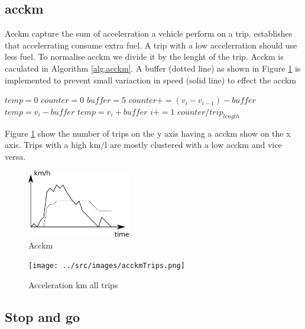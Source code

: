 \subsection{acckm}

Acckm capture the sum of accelerration a vehicle perform on a trip. \cite{} establishes that accelerrating consume extra fuel. A trip with a low accelerration should use less fuel. To normalise acckm we divide it by the lenght of the trip. Acckm is caculated in Algorithm \ref{alg.acckm}. A buffer (dotted line) as shown in Figure \ref{fig:acckm} is implemented to prevent small variaction in speed (solid line) to effect the acckm

\begin{algorithm}
\caption{$acckm$}\label{alg.acckm}
\begin{algorithmic}[1]
\State $temp = 0$
\State $counter = 0$
\State $buffer = 5$
	\State $counter += (v_i - v_{i-1}) - buffer$
	\State $temp = v_i - buffer$
	\State $temp = v_i + buffer$
\EndIf
\State $i+=1$
\EndWhile
\State \Return $ counter / trip_{length}$

\end{algorithmic}
\end{algorithm}

Figure \ref{fig:acckm} show the number of trips on the y axis having a acckm show on the x axis. Trips with a high km/l are mostly clustered with a low acckm and vice versa. 

\begin{figure}[htb]
\centering
\includegraphics[width=0.4\textwidth]{../images/acckm.png}
\caption{Acckm}
\label{fig:acckm}
\end{figure}

\begin{figure}
\centering
\texttt{[image: ../src/images/acckmTrips.png]}
\caption{Acceleration km all trips}
\label{fig:acckmTrips}
\end{figure}

\subsection{Stop and go}

